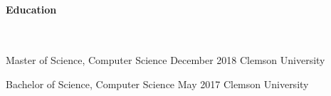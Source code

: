 \documentclass{article}
\begin{document}
	\paragraph{Education} $ $

	\hangindent=0.8in
	Master of Science, Computer Science \hfill December 2018 \newline
	Clemson University \newline

	\hangindent=0.8in
	Bachelor of Science, Computer Science \hfill May 2017 \newline
	Clemson University
	
\end{document}

